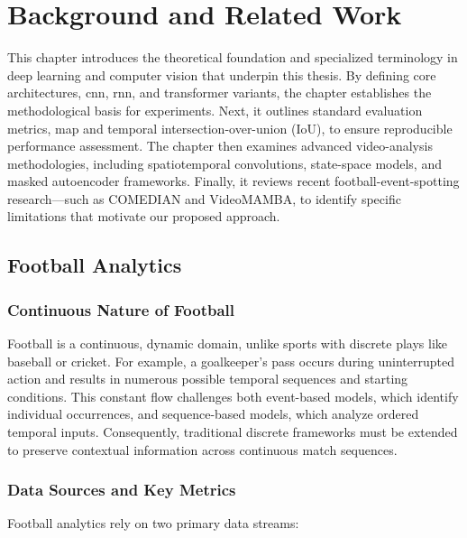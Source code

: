 \chapter{Background and Related Work}
\label{chap:background}

This chapter introduces the theoretical foundation and specialized terminology in deep learning and computer vision that underpin this thesis. By defining core architectures, \acrlong{cnn}, \acrlong{rnn}, and transformer variants, the chapter establishes the methodological basis for experiments. Next, it outlines standard evaluation metrics, \acrfull{map} and temporal intersection-over-union (IoU), to ensure reproducible performance assessment. The chapter then examines advanced video-analysis methodologies, including spatiotemporal convolutions, state-space models, and masked autoencoder frameworks. Finally, it reviews recent football-event-spotting research—such as COMEDIAN and VideoMAMBA, to identify specific limitations that motivate our proposed approach.

\section{Football Analytics}
\label{sec:football_analytics}

\subsection{Continuous Nature of Football}
Football is a continuous, dynamic domain, unlike sports with discrete plays like baseball or cricket. For example, a goalkeeper's pass occurs during uninterrupted action and results in numerous possible temporal sequences and starting conditions. This constant flow challenges both event-based models, which identify individual occurrences, and sequence-based models, which analyze ordered temporal inputs. Consequently, traditional discrete frameworks must be extended to preserve contextual information across continuous match sequences. 

\subsection{Data Sources and Key Metrics}
Football analytics rely on two primary data streams:

